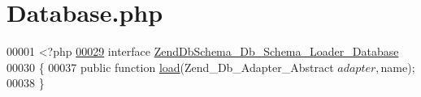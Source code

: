 \hypertarget{Loader_2Database_8php}{\section{Database.\-php}
\label{Loader_2Database_8php}
}

\begin{DoxyCode}
00001 <?php
\hypertarget{Loader_2Database_8php_source_l00029}{}\hyperlink{interfaceZendDbSchema__Db__Schema__Loader__Database}{00029} \textcolor{keyword}{interface }\hyperlink{interfaceZendDbSchema__Db__Schema__Loader__Database}{ZendDbSchema\_Db\_Schema\_Loader\_Database}
00030 \{
00037     \textcolor{keyword}{public} \textcolor{keyword}{function} \hyperlink{interfaceZendDbSchema__Db__Schema__Loader__Database_a10f75b5851a988ef075a6f3eea49b581}{load}(Zend\_Db\_Adapter\_Abstract $adapter, $name);
00038 \}
\end{DoxyCode}
